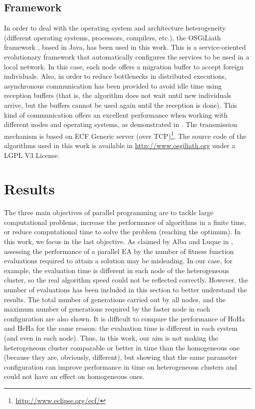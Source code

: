 \documentclass[final,1p,times]{elsarticle}
\begin{document}
\subsection{Framework}
In order to deal with the operating system and architecture heterogeneity (different operating systems, processors, compilers, etc.), the OSGiLiath framework \cite{SOASOCO}, based in Java, has been used in this work. This is a service-oriented evolutionary framework that automatically configures the services to be used in a local network. In this case, each node offers a migration buffer to accept foreign individuals. Also, in order to reduce bottlenecks in distributed executions, asynchronous communication has been provided to avoid idle time using reception buffers (that is, the algorithm does not wait until new individuals arrive, but the buffers cannot be used again until the reception is done). This kind of communication offers an excellent performance when working with different nodes and operating systems, as demonstrated in \cite{HETEROGENEOUSHARD,AsynchronousMerelo08}. The transmission mechanism is based on ECF Generic server (over TCP)\footnote{\url{http://www.eclipse.org/ecf/}}.  The source code of the algorithms used in this work is available in \url{http://www.osgiliath.org} under a LGPL V3 License. 


\section{Results}
\label{sec:results}

The three main objectives of parallel programming are to tackle large computational problems, increase the performance of algorithms in a finite time, or reduce computational time to solve the problem (reaching the optimum). In this work, we focus in the last objective.
As claimed by Alba and Luque in \cite{EVALUATIONPARALLEL}, assessing the performance of a parallel EA by the number of fitness function evaluations required to attain a solution may be misleading. In our case, for example, the evaluation time is different in each node of the heterogeneous cluster, so the real algorithm speed could not be reflected correctly. However, the number of evaluations has been included in this section to better understand the results. The total number of generations carried out by all nodes, and the maximum number of generations required by the faster node in each configuration are also shown. It is difficult to compare the performance of HoHa and HeHa for the same reason: the evaluation time is different in each system (and even in each node). Thus, in this work, our aim is not making the heterogeneous cluster comparable or better in time than the homogeneous one (because they are, obviously, different), but showing that the same parameter configuration can improve performance in time on heterogeneous clusters and could not have an effect on homogeneous ones.
\end{document}
